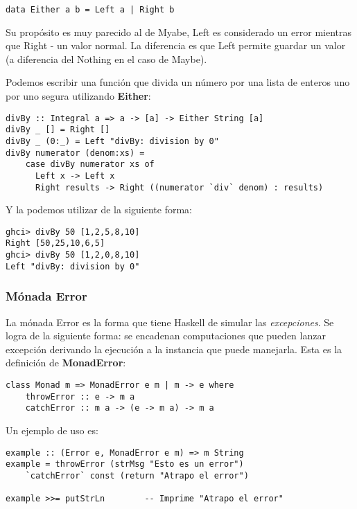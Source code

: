 \begin{lstlisting}
data Either a b = Left a | Right b
\end{lstlisting}

Su propósito es muy parecido al de Myabe, Left es considerado un error
mientras que Right - un valor normal. La diferencia es que Left permite
guardar un valor (a diferencia del Nothing en el caso de Maybe).

Podemos escribir una función que divida un número por una lista de enteros uno por uno segura utilizando \textbf{Either}:

\begin{lstlisting}
divBy :: Integral a => a -> [a] -> Either String [a]
divBy _ [] = Right []
divBy _ (0:_) = Left "divBy: division by 0"
divBy numerator (denom:xs) =
    case divBy numerator xs of
      Left x -> Left x
      Right results -> Right ((numerator `div` denom) : results)
\end{lstlisting}

Y la podemos utilizar de la siguiente forma:

\begin{lstlisting}
ghci> divBy 50 [1,2,5,8,10]
Right [50,25,10,6,5]
ghci> divBy 50 [1,2,0,8,10]
Left "divBy: division by 0"
\end{lstlisting}



\subsubsection{Mónada Error} %
\label{ssub:m_nada_error}

La mónada Error es la forma que tiene Haskell de simular las
\textit{excepciones}. Se logra de la siguiente forma: se encadenan
computaciones que pueden lanzar excepción derivando la ejecución a la
instancia que puede manejarla. Esta es la definición de \textbf{MonadError}:

\begin{lstlisting}
class Monad m => MonadError e m | m -> e where
    throwError :: e -> m a
    catchError :: m a -> (e -> m a) -> m a
\end{lstlisting}

Un ejemplo de uso es:

\begin{lstlisting}
example :: (Error e, MonadError e m) => m String
example = throwError (strMsg "Esto es un error")
    `catchError` const (return "Atrapo el error")

example >>= putStrLn        -- Imprime "Atrapo el error"
\end{lstlisting}


